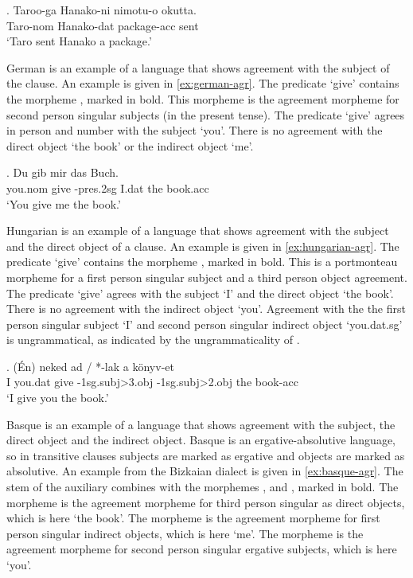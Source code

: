 \exg. Taroo-ga Hanako-ni nimotu-o okutta.\\
 Taro-\ac{nom} Hanako-\ac{dat} package-\ac{acc} sent\\
 `Taro sent Hanako a package.' \label{ex:japanese-agr}

German is an example of a language that shows agreement with the subject of the clause. An example is given in \ref{ex:german-agr}. The predicate  `give' contains the morpheme , marked in bold. This morpheme is the agreement morpheme for second person singular subjects (in the present tense). The predicate  `give' agrees in person and number with the subject  `you'. There is no agreement with the direct object  `the book' or the indirect object  `me'.

\exg. Du gib  mir {das Buch}.\\
 you.\ac{nom} give -\ac{pres}.2\ac{sg} I.\ac{dat} {the book.\ac{acc}}\\
 `You give me the book.' \label{ex:german-agr}

Hungarian is an example of a language that shows agreement with the subject and the direct object of a clause. An example is given in \ref{ex:hungarian-agr}. The predicate  `give' contains the morpheme , marked in bold. This is a portmonteau morpheme for a first person singular subject and a third person object agreement. The predicate  `give' agrees with the subject  `I' and the direct object  `the book'. There is no agreement with the indirect object  `you'. Agreement with the the first person singular subject  `I' and second person singular indirect object  `you.\ac{dat}.\ac{sg}' is ungrammatical, as indicated by the ungrammaticality of .

\exg. (Én) neked ad / *-lak a könyv-et\\
 I you.\ac{dat} give -1\ac{sg}.\ac{subj}>3.\ac{obj} -1\ac{sg}.\ac{subj}>2.\ac{obj} the book-\ac{acc}\\
 `I give you the book.' \label{ex:hungarian-agr}

Basque is an example of a language that shows agreement with the subject, the direct object and the indirect object. Basque is an ergative-absolutive language, so in transitive clauses subjects are marked as ergative and objects are marked as absolutive. An example from the Bizkaian dialect is given in \ref{ex:basque-agr}. The stem of the auxiliary  combines with the morphemes ,  and , marked in bold. The morpheme  is the agreement morpheme for third person singular as direct objects, which is here  `the book'. The morpheme  is the agreement morpheme for first person singular indirect objects, which is here  `me'. The morpheme  is the agreement morpheme for second person singular ergative subjects, which is here  `you'.

